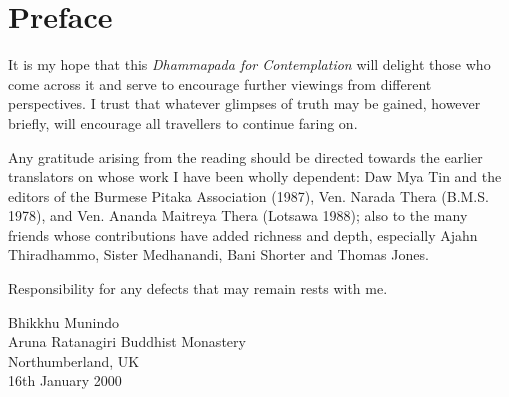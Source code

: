 

\chapter[Preface to the first edition (2000)]{Preface}

It is my hope that this \emph{Dhammapada for Contemplation} will delight those who come across it and serve to encourage further viewings from different perspectives. I trust that whatever glimpses of truth may be gained, however briefly, will encourage all travellers to continue faring on.

Any gratitude arising from the reading should be directed towards the earlier translators on whose work I have been wholly dependent: Daw Mya Tin and  the editors of the  Burmese Pitaka Association (1987), Ven. Narada Thera (B.M.S. 1978), and Ven. Ananda Maitreya Thera  (Lotsawa 1988); also to the many friends whose contributions have added richness and depth, especially Ajahn Thiradhammo, Sister Medhanandi, Bani Shorter and Thomas Jones.

Responsibility for any defects that may remain rests with me.

{\raggedleft
Bhikkhu Munindo\\
Aruna Ratanagiri Buddhist Monastery\\
Northumberland, UK\\
16th January 2000
\par}

